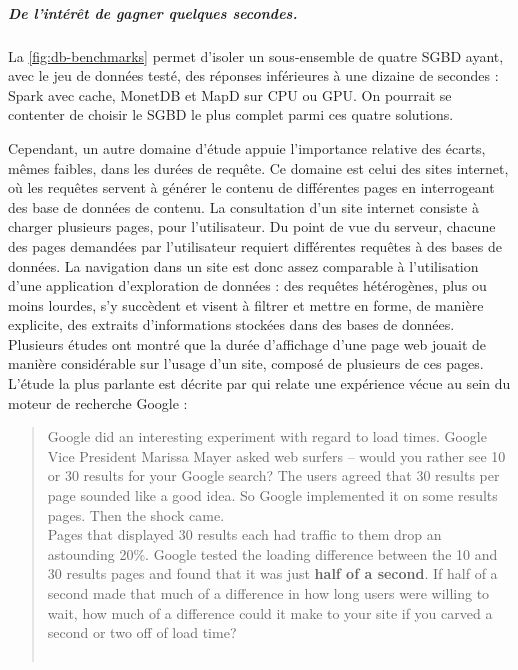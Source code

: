 \subparagraph{De l'intérêt de gagner quelques secondes.}

La \cref{fig:db-benchmarks} permet d'isoler un sous-ensemble de quatre SGBD ayant, avec le jeu de données testé, des réponses inférieures à une dizaine de secondes : Spark avec cache, MonetDB et MapD sur CPU ou GPU.
On pourrait se contenter de choisir le SGBD le plus complet parmi ces quatre solutions.

Cependant, un autre domaine d'étude appuie l'importance relative des écarts, mêmes faibles, dans les durées de requête.
Ce domaine est celui des sites internet, où les requêtes servent à générer le contenu de différentes pages en interrogeant des base de données de contenu.
La consultation d'un site internet consiste à charger plusieurs pages, pour l'utilisateur.
Du point de vue du serveur, chacune des pages demandées par l'utilisateur requiert différentes requêtes à des bases de données.
La navigation dans un site est donc assez comparable à l'utilisation d'une application d'exploration de données : des requêtes hétérogènes, plus ou moins lourdes, s'y succèdent et visent à filtrer et mettre en forme, de manière explicite, des extraits d'informations stockées dans des bases de données.
Plusieurs études ont montré que la durée d'affichage d'une page web jouait de manière considérable sur l'usage d'un site, composé de plusieurs de ces pages.
L'étude la plus parlante est décrite par  qui relate une expérience vécue au sein du moteur de recherche Google :\vspace{-0.5cm}

\begin{quotation}
	\noindent \og
	Google did an interesting experiment with regard to load times. Google Vice President Marissa Mayer asked web surfers – would you rather see 10 or 30 results for your Google search? The users agreed that 30 results per page sounded like a good idea. So Google implemented it on some results pages.
	Then the shock came.\\
	Pages that displayed 30 results each had traffic to them drop an astounding 20\%. Google tested the loading difference between the 10 and 30 results pages and found that it was just \textbf{half of a second}. If half of a second made that much of a difference in how long users were willing to wait, how much of a difference could it make to your site if you carved a second or two off of load time?
	\fg{}\\
	\mbox{}~ \hfill \autocite{patel_speed_2011}
\end{quotation}\vspace{-0.5cm}


